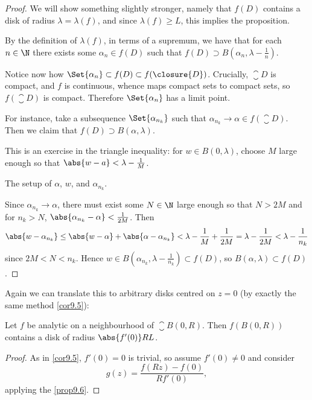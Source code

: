 \begin{proof}
	We will show something slightly stronger, namely that $f(D)$ contains a disk of radius $\lambda = \lambda(f)$, and since $\lambda(f) \geq L$, this implies the proposition.

	By the definition of $\lambda(f)$, in terms of a supremum, we have that for each $n \in \N$ there exists some $\alpha_n \in f(D)$ such that $f(D) \supset B(\alpha_n, \lambda - \frac{1}{n})$.

	Notice now how $\Set{\alpha_n} \subset f(D) \subset f(\closure{D})$.
	Crucially, $\closure{D}$ is compact, and $f$ is continuous, whence maps compact sets to compact sets, so $f(\closure{D})$ is compact.
	Therefore $\Set{\alpha_n}$ has a limit point.

	For instance, take a subsequence $\Set{\alpha_{n_k}}$ such that $\alpha_{n_k} \to \alpha \in f(\closure{D})$.
	Then we claim that $f(D) \supset B(\alpha, \lambda)$.

	This is an exercise in the triangle inequality: for $w \in B(0, \lambda)$, choose $M$ large enough so that $\abs{w - a} < \lambda - \frac{1}{M}$.

	\begin{marginfigure}

		\caption{\label{prop96:fig} The setup of $\alpha$, $w$, and $\alpha_{n_k}$.}
	\end{marginfigure}

	Since $\alpha_{n_k} \to \alpha$, there must exist some $N \in \N$ large enough so that $N > 2 M$ and for $n_k > N$, $\abs{\alpha_{n_k} - \alpha} < \frac{1}{2 M}$.
	Then
	\[
		\abs{w - \alpha_{n_k}} \leq \abs{w - \alpha} + \abs{\alpha -\alpha_{n_k}} < \lambda - \frac{1}{M} + \frac{1}{2 M} = \lambda - \frac{1}{2 M} < \lambda - \frac{1}{n_k}
	\]
	since $2 M < N < n_k$.
	Hence $w \in B(\alpha_{n_k}, \lambda - \frac{1}{n_k}) \subset f(D)$, so $B(\alpha, \lambda) \subset f(D)$.
\end{proof}

Again we can translate this to arbitrary disks centred on $z = 0$ (by exactly the same method \autoref{cor9.5}):

\begin{corollary}\label{cor9.7}
	Let $f$ be analytic on a neighbourhood of $\closure{B(0, R)}$.
	Then $f(B(0, R))$ contains a disk of radius $\abs{f'(0)} R L$.
\end{corollary}

\begin{proof}
	As in \autoref{cor9.5}, $f'(0) = 0$ is trivial, so assume $f'(0) \neq 0$ and consider
	\[
		g(z) = \frac{f(R z) -f(0)}{R f'(0)},
	\]
	applying the \autoref{prop9.6}.
\end{proof}

